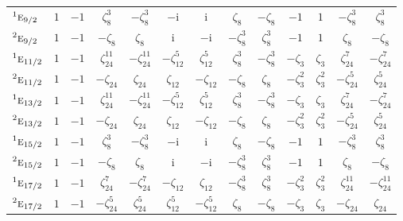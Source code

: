 \documentclass[10pt,a4paper]{article}
\numberwithin{equation}{section}
\newcommand{\irr}[1]{\text{\normalfont\scshape #1}}
\newcommand{\conjpair}[1]{{}^{#1}}
\newcommand{\iunit}{\mathrm{i}}
\newcommand{\rootunity}[1]{\zeta_{#1}}
\begin{document}
{\begin{longtable}{@{}lcccccccccccc@{}}
$\conjpair{1}\irr{e}_{9/2}$ & $1$ & $-1$ & $\rootunity{8}^{3}$ & $-\rootunity{8}^{3}$ & $-\iunit{}$ & $\iunit{}$ & $\rootunity{8}$ & $-\rootunity{8}$ & $-1$ & $1$ & $-\rootunity{8}^{3}$ & $\rootunity{8}^{3}$\\
$\conjpair{2}\irr{e}_{9/2}$ & $1$ & $-1$ & $-\rootunity{8}$ & $\rootunity{8}$ & $\iunit{}$ & $-\iunit{}$ & $-\rootunity{8}^{3}$ & $\rootunity{8}^{3}$ & $-1$ & $1$ & $\rootunity{8}$ & $-\rootunity{8}$\\
$\conjpair{1}\irr{e}_{11/2}$ & $1$ & $-1$ & $\rootunity{24}^{11}$ & $-\rootunity{24}^{11}$ & $-\rootunity{12}^{5}$ & $\rootunity{12}^{5}$ & $\rootunity{8}^{3}$ & $-\rootunity{8}^{3}$ & $-\rootunity{3}$ & $\rootunity{3}$ & $\rootunity{24}^{7}$ & $-\rootunity{24}^{7}$\\
$\conjpair{2}\irr{e}_{11/2}$ & $1$ & $-1$ & $-\rootunity{24}$ & $\rootunity{24}$ & $\rootunity{12}$ & $-\rootunity{12}$ & $-\rootunity{8}$ & $\rootunity{8}$ & $-\rootunity{3}^{2}$ & $\rootunity{3}^{2}$ & $-\rootunity{24}^{5}$ & $\rootunity{24}^{5}$\\
$\conjpair{1}\irr{e}_{13/2}$ & $1$ & $-1$ & $\rootunity{24}^{11}$ & $-\rootunity{24}^{11}$ & $-\rootunity{12}^{5}$ & $\rootunity{12}^{5}$ & $\rootunity{8}^{3}$ & $-\rootunity{8}^{3}$ & $-\rootunity{3}$ & $\rootunity{3}$ & $\rootunity{24}^{7}$ & $-\rootunity{24}^{7}$\\
$\conjpair{2}\irr{e}_{13/2}$ & $1$ & $-1$ & $-\rootunity{24}$ & $\rootunity{24}$ & $\rootunity{12}$ & $-\rootunity{12}$ & $-\rootunity{8}$ & $\rootunity{8}$ & $-\rootunity{3}^{2}$ & $\rootunity{3}^{2}$ & $-\rootunity{24}^{5}$ & $\rootunity{24}^{5}$\\
$\conjpair{1}\irr{e}_{15/2}$ & $1$ & $-1$ & $\rootunity{8}^{3}$ & $-\rootunity{8}^{3}$ & $-\iunit{}$ & $\iunit{}$ & $\rootunity{8}$ & $-\rootunity{8}$ & $-1$ & $1$ & $-\rootunity{8}^{3}$ & $\rootunity{8}^{3}$\\
$\conjpair{2}\irr{e}_{15/2}$ & $1$ & $-1$ & $-\rootunity{8}$ & $\rootunity{8}$ & $\iunit{}$ & $-\iunit{}$ & $-\rootunity{8}^{3}$ & $\rootunity{8}^{3}$ & $-1$ & $1$ & $\rootunity{8}$ & $-\rootunity{8}$\\
$\conjpair{1}\irr{e}_{17/2}$ & $1$ & $-1$ & $\rootunity{24}^{7}$ & $-\rootunity{24}^{7}$ & $-\rootunity{12}$ & $\rootunity{12}$ & $-\rootunity{8}^{3}$ & $\rootunity{8}^{3}$ & $-\rootunity{3}^{2}$ & $\rootunity{3}^{2}$ & $\rootunity{24}^{11}$ & $-\rootunity{24}^{11}$\\
$\conjpair{2}\irr{e}_{17/2}$ & $1$ & $-1$ & $-\rootunity{24}^{5}$ & $\rootunity{24}^{5}$ & $\rootunity{12}^{5}$ & $-\rootunity{12}^{5}$ & $\rootunity{8}$ & $-\rootunity{8}$ & $-\rootunity{3}$ & $\rootunity{3}$ & $-\rootunity{24}$ & $\rootunity{24}$\\

\end{longtable}}
\end{document}
